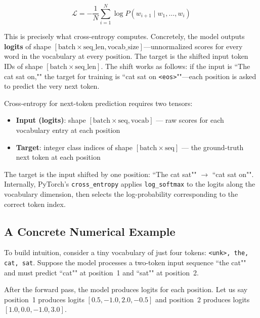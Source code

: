 \[
  \mathcal{L} = -\frac{1}{N}\sum_{i=1}^{N} \log P(w_{i+1} \mid w_1, \ldots, w_i)
\]

This is precisely what cross-entropy computes. Concretely, the model outputs \textbf{logits} of shape $[\text{batch} \times \text{seq\_len}, \text{vocab\_size}]$---unnormalized scores for every word in the vocabulary at every position. The target is the shifted input token IDs of shape $[\text{batch} \times \text{seq\_len}]$. The shift works as follows: if the input is ``The cat sat on,"" the target for training is ``cat sat on \texttt{<eos>}""---each position is asked to predict the very next token.

\begin{keyconcept}
  Cross-entropy for next-token prediction requires two tensors:
  \begin{itemize}
    \item \textbf{Input (logits)}: shape $[\text{batch} \times \text{seq}, \text{vocab}]$ --- raw scores for each vocabulary entry at each position
    \item \textbf{Target}: integer class indices of shape $[\text{batch} \times \text{seq}]$ --- the ground-truth next token at each position
  \end{itemize}
  The target is the input shifted by one position: ``The cat sat"" $\rightarrow$ ``cat sat on"". Internally, PyTorch's \texttt{cross\_entropy} applies \texttt{log\_softmax} to the logits along the vocabulary dimension, then selects the log-probability corresponding to the correct token index.
\end{keyconcept}

\subsection{A Concrete Numerical Example}

To build intuition, consider a tiny vocabulary of just four tokens: \texttt{<unk>, the, cat, sat}. Suppose the model processes a two-token input sequence ``the cat"" and must predict ``cat"" at position~1 and ``sat"" at position~2.

After the forward pass, the model produces logits for each position. Let us say position~1 produces logits $[0.5, -1.0, 2.0, -0.5]$ and position~2 produces logits $[1.0, 0.0, -1.0, 3.0]$.

